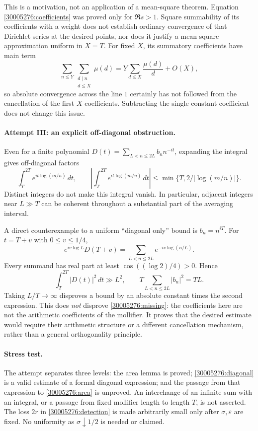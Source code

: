 \documentclass[11pt,a4paper]{article}
\numberwithin{equation}{section}
\begin{document}
This is a motivation, not an application of a mean-square theorem.
Equation \eqref{30005276:coefficients} was proved only for $\Re s>1$.
Square summability of its coefficients with a weight does not establish
ordinary convergence of that Dirichlet series at the desired points,
nor does it justify a mean-square approximation uniform in $X=T$.
For fixed $X$, its summatory coefficients have main term
\[
 \sum_{n\leq Y}\sum_{\substack{d\mid n\\d\leq X}}\mu(d)
   =Y\sum_{d\leq X}\frac{\mu(d)}d+O(X),
\]
so absolute convergence across the line $1$ certainly has not followed
from the cancellation of the first $X$ coefficients.  Subtracting the
single constant coefficient does not change this issue.

\paragraph{Attempt III: an explicit off-diagonal obstruction.}
Even for a finite polynomial $D(t)=\sum_{L<n\leq2L}b_n n^{-it}$,
expanding the integral gives off-diagonal factors
\[
 \int_T^{2T}e^{it\log(m/n)}\,dt,
 \qquad
 \left|\int_T^{2T}e^{it\log(m/n)}\,dt\right|
 \leq\min\{T,2/|\log(m/n)|\}.
\]
Distinct integers do not make this integral vanish.  In particular,
adjacent integers near $L\gg T$ can be coherent throughout a substantial
part of the averaging interval.

A direct counterexample to a uniform ``diagonal only'' bound is
$b_n=n^{iT}$.  For $t=T+v$ with $0\leq v\leq1/4$,
\[
 e^{iv\log L}D(T+v)=\sum_{L<n\leq2L}e^{-iv\log(n/L)}.
\]
Every summand has real part at least $\cos((\log2)/4)>0$.  Hence
\[
 \int_T^{2T}|D(t)|^2\,dt\gg L^2,
 \qquad T\sum_{L<n\leq2L}|b_n|^2=TL.
\]
Taking $L/T\to\infty$ disproves a bound by an absolute constant times
the second expression.  This does \emph{not} disprove
\eqref{30005276:missing}: the coefficients here are not the arithmetic
coefficients of the mollifier.  It proves that the desired estimate
would require their arithmetic structure or a different cancellation
mechanism, rather than a general orthogonality principle.

\paragraph{Stress test.}
The attempt separates three levels: the area lemma is proved;
\eqref{30005276:diagonal} is a valid estimate of a formal diagonal expression;
and the passage from that expression to \eqref{30005276:area} is unproved.
An interchange of an infinite sum with an integral, or a passage from
fixed mollifier length to length $T$, is not asserted.  The loss
$2r$ in \eqref{30005276:detection} is made arbitrarily small only after
$\sigma,\varepsilon$ are fixed.  No uniformity as $\sigma\downarrow1/2$
is needed or claimed.
\end{document}
